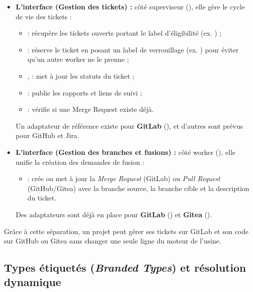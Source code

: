 \documentclass{tnreport}
\begin{document}
\begin{itemize}
    \item \textbf{L'interface  (Gestion des tickets) :} 
    côté superviseur (), elle gère le cycle de vie des tickets :
    \begin{itemize}
        \item {} : récupère les tickets ouverts portant le label d'éligibilité (ex. ) ;
        \item {} : réserve le ticket en posant un label de verrouillage (ex. ) pour éviter qu'un autre worker ne le prenne ;
        \item {},  : met à jour les statuts du ticket ;
        \item {} : publie les rapports et liens de suivi ;
        \item {} : vérifie si une Merge Request existe déjà.
    \end{itemize}
    Un adaptateur de référence existe pour \textbf{GitLab} (), et d'autres sont prévus pour GitHub et Jira.

    \item \textbf{L'interface  (Gestion des branches et fusions) :} 
    côté worker (), elle unifie la création des demandes de fusion :
    \begin{itemize}
        \item {} : crée ou met à jour la \textit{Merge Request} (GitLab) ou \textit{Pull Request} (GitHub/Gitea) avec la branche source, la branche cible et la description du ticket.
    \end{itemize}
    Des adaptateurs sont déjà en place pour \textbf{GitLab} () et \textbf{Gitea} ().
\end{itemize}

Grâce à cette séparation, un projet peut gérer ses tickets sur GitLab et son code sur GitHub ou Gitea sans changer une seule ligne du moteur de l'usine.

\subsection{Types étiquetés (\textit{Branded Types}) et résolution dynamique}
\label{subsec:provider_resolver}
\end{document}
